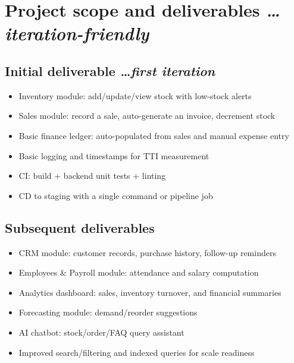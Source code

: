 \documentclass[11pt,a4paper]{article}
\newcommand{\BvrHint}[1]{%
  {\normalfont\normalsize\itshape\hfill #1}}
\begin{document}
\section{Project scope and deliverables %
\BvrHint{\ldots iteration-friendly}}
\subsection{Initial deliverable %
\BvrHint{\ldots first iteration}}
\begin{itemize}[leftmargin=0.7cm]
    \item Inventory module: add/update/view stock with low-stock alerts
    \item Sales module: record a sale, auto-generate an invoice, decrement stock
    \item Basic finance ledger: auto-populated from sales and manual expense entry
    \item Basic logging and timestamps for TTI measurement
    \item CI: build + backend unit tests + linting
    \item CD to staging with a single command or pipeline job
\end{itemize}

\subsection{Subsequent deliverables}
\begin{itemize}[leftmargin=0.7cm]
    \item CRM module: customer records, purchase history, follow-up reminders
    \item Employees \& Payroll module: attendance and salary computation
    \item Analytics dashboard: sales, inventory turnover, and financial summaries
    \item Forecasting module: demand/reorder suggestions
    \item AI chatbot: stock/order/FAQ query assistant
    \item Improved search/filtering and indexed queries for scale readiness
\end{itemize}
\end{document}

